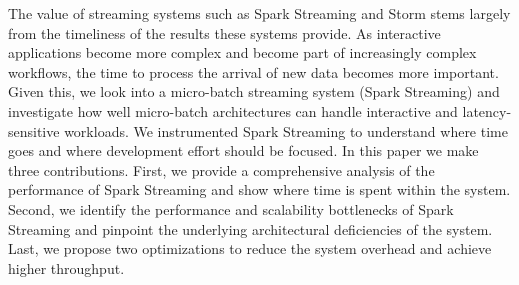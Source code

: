 The value of streaming systems such as Spark Streaming and Storm stems largely from the timeliness of the results these systems provide.
As interactive applications become more complex and become part of increasingly complex workflows, the time to process the arrival of new data becomes more important.
Given this, we look into a micro-batch streaming system (Spark Streaming) and investigate how well micro-batch architectures can handle interactive and latency-sensitive workloads. 
We instrumented Spark Streaming to understand where time goes and where development effort should be focused.
In this paper we make three contributions. 
First, we provide a comprehensive analysis of the performance of Spark Streaming and show where time is spent within the system. 
Second, we identify the performance and scalability bottlenecks of Spark Streaming and pinpoint the underlying architectural deficiencies of the system. 
Last, we propose two optimizations to reduce the system overhead and achieve higher throughput.
        

